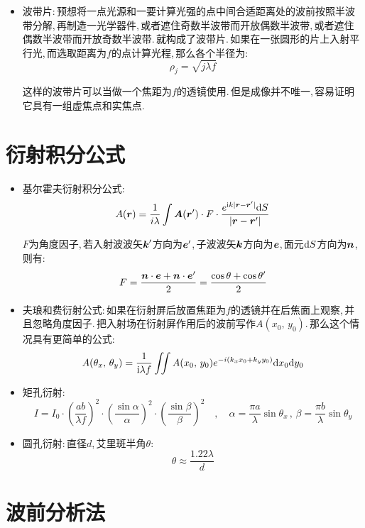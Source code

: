 \begin{itemize}
\item 波带片:\,预想将一点光源和一要计算光强的点中间合适距离处的波前按照半波带分解,\,再制造一光学器件,\,或者遮住奇数半波带而开放偶数半波带,\,或者遮住偶数半波带而开放奇数半波带.\,就构成了波带片.\,如果在一张圆形的片上入射平行光,\,而选取距离为$f$的点计算光程,\,那么各个半径为:
\[\rho_j=\sqrt{j\lambda f}\]

这样的波带片可以当做一个焦距为$f$的透镜使用.\,但是成像并不唯一,\,容易证明它具有一组虚焦点和实焦点.


\end{itemize}


\section{衍射积分公式}

\begin{itemize}
\item 基尔霍夫衍射积分公式:
\[A(\boldsymbol{r})=\frac{1}{i\lambda}\int \boldsymbol{A}(\boldsymbol{r}')\cdot F\cdot \frac{e^{{\rm i} k|\boldsymbol{r}-\boldsymbol{r}'|}\textrm{d} S}{|\boldsymbol{r}-\boldsymbol{r}'|}\]

$F$为角度因子,\,若入射波波矢$\boldsymbol{k}'$方向为$\boldsymbol{e}'$,\,子波波矢$\boldsymbol{k}$方向为$\boldsymbol{e}$,\,面元$\textrm{d} S$方向为$\boldsymbol{n}$,\,则有:
\[F=\frac{\boldsymbol{n}\cdot \boldsymbol{e}+\boldsymbol{n}\cdot \boldsymbol{e}'}{2}=\frac{\cos\theta+\cos \theta'}{2}\]

\item 夫琅和费衍射公式:\,如果在衍射屏后放置焦距为$f$的透镜并在后焦面上观察,\,并且忽略角度因子.\,把入射场在衍射屏作用后的波前写作$A(x_0,\,y_0)$.\,那么这个情况具有更简单的公式:
\[A(\theta_x,\,\theta_y)=\frac{1}{{\rm i}\lambda f}\iint A(x_0,\,y_0)e^{-i(k_x x_0+k_y y_0)}\textrm{d} x_0\textrm{d} y_0\]

\item 矩孔衍射:
\[I=I_0\cdot \left(\frac{ab}{\lambda f}\right)^2\cdot \left(\frac{\sin\alpha}{\alpha}\right)^2\cdot \left(\frac{\sin\beta}{\beta}\right)^2\quad ,\quad \alpha =\frac{\pi a}{\lambda}\sin\theta_x\,,\,\beta =\frac{\pi b}{\lambda}\sin\theta_y\]

\item 圆孔衍射:\,直径$d$,\,艾里斑半角$\theta$:
\[\theta\approx \frac{1.22\lambda 	}{d}\]
\end{itemize}

\section{波前分析法}
